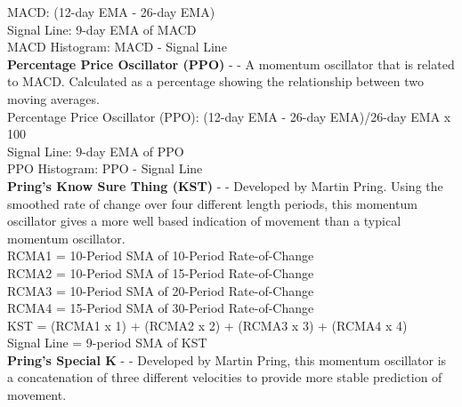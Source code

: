 \documentclass[12pt,a4paper]{article}
\begin{document}
\noindent
MACD: (12-day EMA - 26-day EMA) \\
Signal Line: 9-day EMA of MACD \\
MACD Histogram: MACD - Signal Line \\

\iffalse
[]
\fi

\noindent
\textbf{Percentage Price Oscillator (PPO)} - \cite{Murphy1999} - A momentum oscillator that is related to MACD. Calculated as a percentage showing the relationship between two moving averages. \\

\noindent
Percentage Price Oscillator (PPO): {(12-day EMA - 26-day EMA)/26-day EMA} x 100 \\
Signal Line: 9-day EMA of PPO \\
PPO Histogram: PPO - Signal Line \\

\iffalse
[]
\fi

\noindent
\textbf{Pring's Know Sure Thing (KST)} - \cite{Pring2002} - Developed by Martin Pring. Using the smoothed rate of change over four different length periods, this momentum oscillator gives a more well based indication of movement than a typical momentum oscillator. \\

\noindent
RCMA1 = 10-Period SMA of 10-Period Rate-of-Change \\
RCMA2 = 10-Period SMA of 15-Period Rate-of-Change \\
RCMA3 = 10-Period SMA of 20-Period Rate-of-Change \\
RCMA4 = 15-Period SMA of 30-Period Rate-of-Change \\
KST = (RCMA1 x 1) + (RCMA2 x 2) + (RCMA3 x 3) + (RCMA4 x 4) \\
Signal Line = 9-period SMA of KST \\

\iffalse
[]
\fi

\noindent
\textbf{Pring's Special K} - \cite{Pring2002} - Developed by Martin Pring, this momentum oscillator is a concatenation of three different velocities to provide more stable prediction of movement. \\
\end{document}
